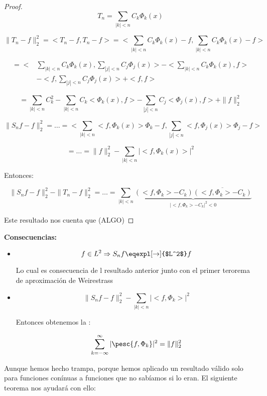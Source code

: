 			\begin{proof}

				\[ T_n = \sum_{|k| < n} C_k \Phi_k(x) \]

				\[ \| T_n - f \|_{2}^2 = < T_n -f, T_n - f> = < \sum_{|k| < n} C_k \Phi_k(x) - f, \sum_{|k| < n} C_k \Phi_k(x) - f >   \]

				\begin{align*} = < &\sum_{|k| < n} C_k \Phi_k(x), \sum_{|j| < n} C_j \Phi_j(x) > - < \sum_{|k| < n} C_k \Phi_k(x), f> \\ &- <f, \sum_{|j| < n} C_j \Phi_j(x)> + <f,f> \end{align*}

				\[ = \sum_{|k| < n} C_k^2 - \sum_{|k| < n} C_k <\Phi_k(x),f> - \sum_{|j| < n} C_j <\Phi_j(x),f> + \|f\|_2^2  \]


				\[ \| S_n f - f \|_2^2 = … = < \sum_{|k| < n} <f,\Phi_k(x)> \Phi_k -f,  \sum_{|j| < n} <f,\Phi_j(x)> \Phi_j -f>\]

				\[ = … = \|f\|_2^2 - \sum_{|k| < n} |<f,\Phi_k(x)>|^2 \]

				Entonces:

				\[ \| S_n f - f \|_2^2 - \|T_n -f\|_2^2 = … = \sum_{|k| < n} \underbrace{(<f,\Phi_k> - C_k) \overline{(<f,\Phi_k> - C_k)}}_{|<f, \Phi_k> - C_k|^2 < 0}  \]


				Este resultado nos cuenta que (ALGO)
			\end{proof}

		\textbf{Consecuencias:}

		\begin{itemize}

			\item  \[ f \in L^2 \Rightarrow S_n f \eqexpl[\rightarrow]{$L^2$} f \]

			Lo cual es consecuencia de l resultado anterior junto con el primer terorema de aproximación de Weirestrass

			\item \[ \| S_n f - f \|_{2}^2 - \sum_{|k|<n} | <f, \Phi_k> |^2  \]

			Entonces obtenemos la :

			\[ \sum_{k= -\infty}^\infty  |\pesc{f, \Phi_k}|^2 = \|f\|^2_2 \]


		\end{itemize}



		Aunque hemos hecho trampa, porque hemos aplicado un resultado válido solo para funciones conínuas a funciones que no sabíamos si lo eran. El siguiente teorema nos ayudará con ello:

